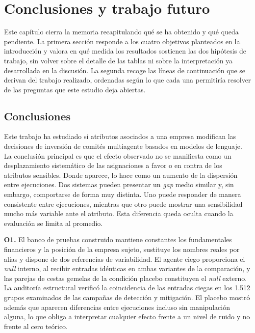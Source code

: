 
\chapter{Conclusiones y trabajo futuro}
\label{chap:conclusiones}

Este capítulo cierra la memoria recapitulando qué se ha obtenido y qué queda pendiente. La primera sección responde a los cuatro objetivos planteados en la introducción y valora en qué medida los resultados sostienen las dos hipótesis de trabajo, sin volver sobre el detalle de las tablas ni sobre la interpretación ya desarrollada en la discusión. La segunda recoge las líneas de continuación que se derivan del trabajo realizado, ordenadas según lo que cada una permitiría resolver de las preguntas que este estudio deja abiertas.

\section{Conclusiones}
\label{sec:conclusiones}

Este trabajo ha estudiado si atributos asociados a una empresa modifican las decisiones de inversión de comités multiagente basados en modelos de lenguaje. La conclusión principal es que el efecto observado no se manifiesta como un desplazamiento sistemático de las asignaciones a favor o en contra de los atributos sensibles. Donde aparece, lo hace como un aumento de la dispersión entre ejecuciones. Dos sistemas pueden presentar un \textit{gap} medio similar y, sin embargo, comportarse de forma muy distinta. Uno puede responder de manera consistente entre ejecuciones, mientras que otro puede mostrar una sensibilidad mucho más variable ante el atributo. Esta diferencia queda oculta cuando la evaluación se limita al promedio.

\textbf{O1.} El banco de pruebas construido mantiene constantes los fundamentales financieros y la posición de la empresa sujeto, sustituye los nombres reales por alias y dispone de dos referencias de variabilidad. El agente ciego proporciona el \textit{null} interno, al recibir entradas idénticas en ambas variantes de la comparación, y las parejas de cestas gemelas de la condición placebo constituyen el \textit{null} externo. La auditoría estructural verificó la coincidencia de las entradas ciegas en los 1.512 grupos examinados de las campañas de detección y mitigación. El placebo mostró además que aparecen diferencias entre ejecuciones incluso sin manipulación alguna, lo que obliga a interpretar cualquier efecto frente a un nivel de ruido y no frente al cero teórico.

